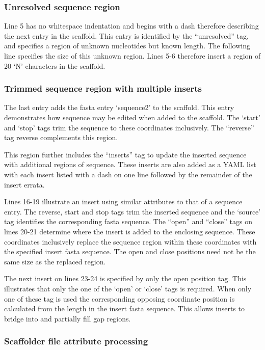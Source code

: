 \documentclass[10pt]{bmc_article}
\newenvironment{bmcformat}{\begin{raggedright}\baselineskip20pt\sloppy\setboolean{publ}{false}}{\end{raggedright}\baselineskip20pt\sloppy}
\begin{document}
\begin{bmcformat}
\subsubsection*{Unresolved sequence region} %

Line 5 has no whitespace indentation and begins with a dash therefore
describing the next entry in the scaffold. This entry is identified by the
``unresolved'' tag, and specifies a region of unknown nucleotides but known
length. The following line specifies the size of this unknown region. Lines 5-6
therefore insert a region of 20 `N' characters in the scaffold. \pb

\subsubsection*{Trimmed sequence region with multiple inserts} %

The last entry adds the fasta entry `sequence2' to the scaffold. This entry
demonstrates how sequence may be edited when added to the scaffold. The `start'
and `stop' tags trim the sequence to these coordinates inclusively. The
``reverse'' tag reverse complements this region. \pb

This region further includes the ``inserts'' tag to update the inserted
sequence with additional regions of sequence. These inserts are also added as
a YAML list with each insert listed with a dash on one line followed by the
remainder of the insert errata. \pb

Lines 16-19 illustrate an insert using similar attributes to that of a sequence
entry. The reverse, start and stop tags trim the inserted sequence and the
`source' tag identifies the corresponding fasta sequence. The ``open'' and
``close'' tags on lines 20-21 determine where the insert is added to the
enclosing sequence.  These coordinates inclusively replace the sequence region
within these coordinates with the specified insert fasta sequence. The open and
close positions need not be the same size as the replaced region. \pb

The next insert on lines 23-24 is specified by only the open position tag. This
illustrates that only the one of the `open' or `close' tags is required.  When
only one of these tag is used the corresponding opposing coordinate position is
calculated from the length in the insert fasta sequence. This allows inserts to
bridge into and partially fill gap regions. \pb

\subsubsection*{Scaffolder file attribute processing} %


\end{bmcformat}
\end{document}
